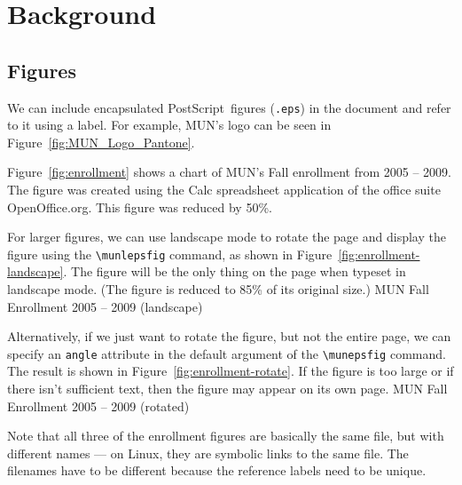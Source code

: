 \chapter{Background}
\label{chap:tools}

\section{Figures}

We can include encapsulated PostScript\texttrademark\ figures
(\texttt{.eps}) in the document and refer to it using a label.
For example, MUN's logo can be seen in Figure~\ref{fig:MUN_Logo_Pantone}.

Figure~\ref{fig:enrollment} shows a chart of MUN's Fall
enrollment from 2005 -- 2009.
The figure was created using the \textsf{Calc} spreadsheet application of
the office suite \textsf{OpenOffice.org}.  This figure was reduced by 50\%.

For larger figures, we can use landscape mode to rotate the page
and display the figure using the \verb+\munlepsfig+ command, as shown
in Figure~\ref{fig:enrollment-landscape}.  The figure will be the
only thing on the page when typeset in landscape mode.
(The figure is reduced to 85\% of its original size.)
	{MUN Fall Enrollment 2005 -- 2009 (landscape)}

Alternatively, if we just want to rotate the figure, but not
the entire page, we can specify an \texttt{angle} attribute
in the default argument of the \verb+\munepsfig+ command.
The result is shown in Figure~\ref{fig:enrollment-rotate}.
If the figure is too large or if there isn't sufficient
text, then the figure may appear on its own page.
	{MUN Fall Enrollment 2005 -- 2009 (rotated)}

Note that all three of the enrollment figures are basically
the same file, but with different names --- on Linux, they are
symbolic links to the same file.  The filenames have to be different
because the reference labels need to be unique.

